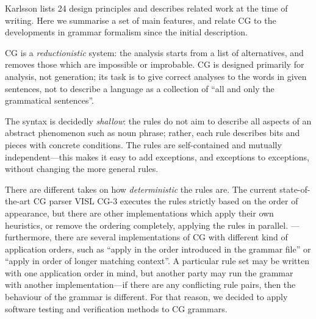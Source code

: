 Karlsson \cite{karlsson1995constraint} lists 24 design principles and describes
related work at the time of writing.
Here we summarise a set of main features, and relate CG to the developments in grammar formalism since the initial description.

CG is a \emph{reductionistic} system: the analysis starts from a list of alternatives,
and removes those which are impossible or improbable.
CG is designed primarily for analysis, not generation; its task is 
to give correct analyses to the words in given sentences,
not to describe a language as a collection of ``all and only the grammatical sentences''.

The syntax is decidedly \emph{shallow}: the rules do not aim to
describe all aspects of an abstract phenomenon such as noun phrase; 
rather, each rule describes bits and pieces with concrete conditions.
The rules are self-contained and mutually independent---this makes it 
easy to add exceptions, and exceptions to exceptions, without 
changing the more general rules.



There are different takes on how \emph{deterministic} the rules are.
The current state-of-the-art CG parser VISL CG-3 executes the rules strictly 
based on the order of appearance, but there are other implementations which 
apply their own heuristics, or remove the ordering completely, 
applying the rules in parallel. 
---furthermore, there are several implementations of CG with different kind of application orders,
such as ``apply in the order introduced in the grammar file'' or ``apply in order of longer matching context''.
A particular rule set may be written with one application order in mind, but another party may 
run the grammar with another implementation---if there are any conflicting rule pairs, then the behaviour of the grammar is different.
For that reason, we decided to apply software testing and verification methods to CG grammars.





